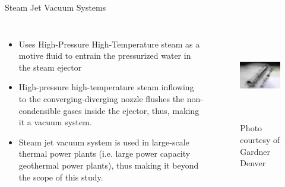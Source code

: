 \begin{frame}{Steam Jet Vacuum Systems\cite{NASH:Technology}}
    \begin{columns}
       \begin{itemize}
           \item \small Uses High-Pressure High-Temperature steam as a motive fluid to entrain the pressurized water in the steam ejector
           \item \small High-pressure high-temperature steam inflowing to the converging-diverging nozzle flushes the non-condensible gases inside the ejector, thus, making it a vacuum system.
           \item \small Steam jet vacuum system is used in large-scale thermal power plants (i.e. large power capacity geothermal power plants), thus making it beyond the scope of this study.
       \end{itemize}
    \begin{figure}[h]
    \centering
    \includegraphics[height=4cm]{images/SteamVacuumsystem.PNG}
    \caption{Photo courtesy of Gardner Denver\cite{NASH:Technology}}
    \end{figure}
  \end{columns}
\end{frame}

